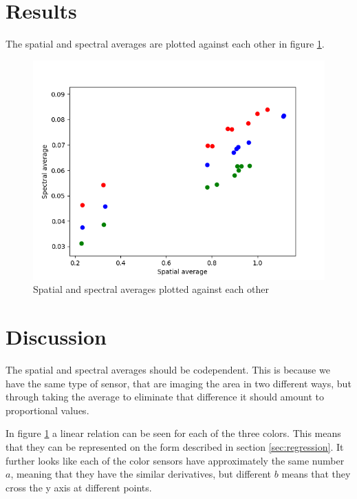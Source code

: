 \section{Results}

The spatial and spectral averages are plotted against each other in figure \ref{fig:spectral_vs_spatial_values}. 
\begin{figure}[h]
    \centering
    \includegraphics[width=1\textwidth]{Plots/spectral_vs_spatial_average.png}
    \caption{Spatial and spectral averages plotted against each other}
    \label{fig:spectral_vs_spatial_values}
\end{figure}



\section{Discussion}
The spatial and spectral averages should be codependent. This is because we have the same type of sensor, that are imaging the area in two different ways, but through taking the average to eliminate that difference it should amount to proportional values. 

In figure \ref{fig:spectral_vs_spatial_values} a linear relation can be seen for each of the three colors. This means that they can be represented on the form described in section \ref{sec:regression}. It further looks like each of the color sensors have approximately the same number $a$, meaning that they have the similar derivatives, but different $b$ means that they cross the y axis at different points. 